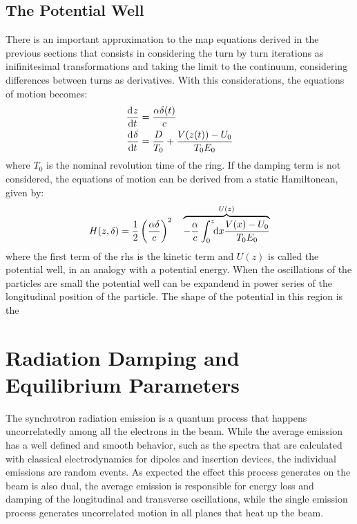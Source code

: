 \documentclass[
	12pt,				%
	openright,			%
	oneside,			%
	a4paper,		%
	chapter=TITLE,		%
	section=TITLE,		%
    brazil,				%
	english,			%
	sumario=tradicional,
	]{abntex2}
\begin{document}
    \subsection{The Potential Well}

	There is an important approximation to the map equations derived in the previous sections that consists in considering the turn by turn iterations as inifinitesimal transformations and taking the limit to the continuum, considering differences between turns as derivatives. With this considerations, the equations of motion becomes:
	\begin{align}
		\dertot{z}{t} &= \frac{\alpha \delta(t)}{c} \\\nonumber
		\dertot{\delta}{t} &= \frac{D}{T_0} + \frac{V(z(t))-U_0}{T_0E_0}
	\end{align}
	where $T_0$ is the nominal revolution time of the ring. If the damping term is not considered, the equations of motion can be derived from a static Hamiltonean, given by:
	\begin{align}
		H(z, \delta) = \frac12\left(\frac{\alpha\delta}{c}\right)^2 \quad \overbrace{- \frac{\alpha}{c}\defint{x}{\frac{V(x)-U_0}{T_0E_0}}{0}{z}}^{U(z)}
	\end{align}
	where the first term of the \gls{rhs} is the kinetic term and $U(z)$ is called the potential well, in an analogy with a potential energy. When the oscillations of the particles are small the potential well can be expandend in power series of the longitudinal position of the particle. The shape of the potential in this region is the

  \section{Radiation Damping and Equilibrium Parameters}

  The synchrotron radiation emission is a quantum process that happens uncorrelatedly among all the electrons in the beam. While the average emission has a well defined and smooth behavior, such as the spectra that are calculated with classical electrodynamics for dipoles and insertion devices, the individual emissions are random events. As expected the effect this process generates on the beam is also dual, the average emission is responsible for energy loss and damping of the longitudinal and transverse oscillations, while the single emission process generates uncorrelated motion in all planes that heat up the beam.
\end{document}
